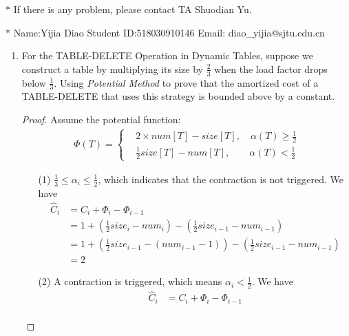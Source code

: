 \documentclass[12pt,a4paper]{article}
\theoremstyle{definition}
\begin{document}
\noindent

\noindent{}
\begin{center}
\footnotesize{\color{red}$*$ If there is any problem, please contact TA Shuodian Yu. }

\footnotesize{\color{blue}$*$ Name:Yijia Diao  \quad Student ID:518030910146 \quad Email: diao\_yijia@sjtu.edu.cn}
\end{center}
\begin{enumerate}
	\item For the TABLE-DELETE Operation in Dynamic Tables, suppose we construct a table by multiplying its size by $\frac 23$ when the load factor drops below $\frac 13$. Using \emph{Potential Method} to prove that the amortized cost of a TABLE-DELETE that uses this strategy is bounded above by a constant.
	\begin{proof}
		Assume the potential function:\\
		\begin{align*}
			\Phi(T) = 
			\begin{cases}
			&2\times num[T] - size[T] ,\quad\alpha(T)\ge \frac{1}{2}\\
			&\frac{1}{2}size[T] - num[T],\quad\quad\alpha(T)< \frac{1}{2}
			\end{cases}
		\end{align*}
		\begin{enumerate}
			\item[(1)] $\frac{1}{3}\le\alpha_i \le \frac{1}{2}$, which indicates that the contraction is not triggered. We have
			\begin{align*}
				\widehat{C}_i &= C_i + \Phi_i - \Phi_{i - 1}\\
							  &= 1 + (\frac{1}{2}size_i - num_i) - (\frac{1}{2}size_{i - 1} - num_{i - 1})\\
							  &= 1 + (\frac{1}{2}size_{i - 1} - (num_{i - 1} - 1)) - (\frac{1}{2}size_{i - 1} - num_{i - 1})\\
							  &= 2
			\end{align*}
			\item[(2)] A contraction is triggered, which means $ \alpha_{i}< \frac{1}{2} $. We have
			\begin{align*}
				\widehat{C}_i &= C_i + \Phi_i - \Phi_{i - 1}\\

\end{align*}
\end{enumerate}
\end{proof}
\end{enumerate}
\end{document}
